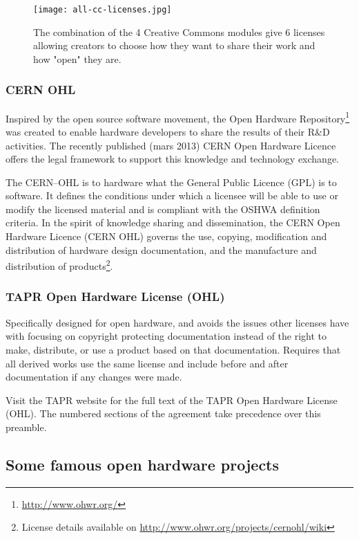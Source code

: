 \begin{figure}[]
    \begin{center}
        \texttt{[image: all-cc-licenses.jpg]}
    \end{center}
    \caption{The combination of the 4 Creative Commons modules give 6 licenses allowing creators to choose how they want to share their work and how "open" they are.}
    \label{fig:all-cc-licenses}
\end{figure}

\subsubsection{CERN OHL} %

Inspired by the open source software movement, the Open Hardware Repository\footnote{\url{http://www.ohwr.org/}} was created to enable hardware developers to share the results of their R\&D activities. The recently published (mars 2013) CERN Open Hardware Licence offers the legal framework to support this knowledge and technology exchange.

The CERN–OHL is to hardware what the General Public Licence (GPL) is to software. It defines the conditions under which a licensee will be able to use or modify the licensed material and is compliant with the OSHWA definition criteria. In the spirit of knowledge sharing and dissemination, the CERN Open Hardware Licence (CERN OHL) governs the use, copying, modification and distribution of hardware design documentation, and the manufacture and distribution of products\footnote{License details available on \url{http://www.ohwr.org/projects/cernohl/wiki}}.


\subsubsection{TAPR Open Hardware License (OHL)}
Specifically designed for open hardware, and avoids the issues other licenses have with focusing on copyright protecting documentation instead of the right to make, distribute, or use a product based on that documentation. Requires that all derived works use the same license and include before and after documentation if any changes were made.

Visit the TAPR website for the full text of the TAPR Open Hardware License (OHL). The numbered sections of the agreement take precedence over this preamble.


\subsection{Some famous open hardware projects} %


